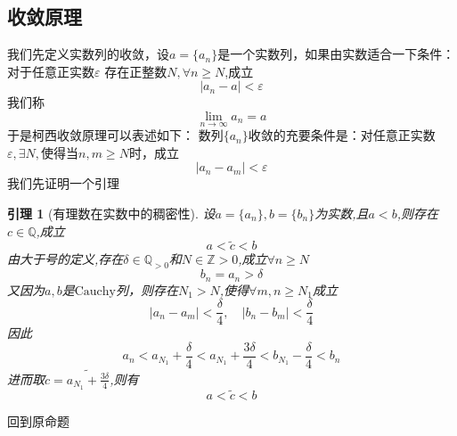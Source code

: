 \documentclass[12pt, a4paper, oneside]{ctexart}
\newtheorem{lemma}{引理}[section]
\newcommand{\ep}{\varepsilon}
\newcommand{\cau}{\text{Cauchy}}
\newcommand{\an}{\{a_{n}\}}
\newcommand{\bn}{\{b_{n}\}}
\newcommand{\bol}{\widetilde}
\begin{document}
\subsection{\cau 收敛原理}
我们先定义实数列的收敛，设$a=\an$是一个实数列，如果由实数适合一下条件：对于任意正实数$\ep$
存在正整数$N,\forall n\ge N $,成立
\begin{equation*}
    |a_{n}-a|<\ep
\end{equation*}
我们称 $$\lim_{n \to \infty}a_{n}=a $$
于是柯西收敛原理可以表述如下：
数列$\an$收敛的充要条件是：对任意正实数$\ep,\exists N,$使得当$n,m\ge N$时，成立
\begin{equation*}
    |a_{n}-a_{m}|<\ep
\end{equation*}
我们先证明一个引理
\begin{lemma}[有理数在实数中的稠密性]
    设$a=\an,b=\bn$为实数,且$a<b$,则存在$c\in \mathbb{Q}$,成立
    \begin{equation*}
        a<\bol{c}<b
    \end{equation*}
    由大于号的定义,存在$\delta\in\mathbb{Q}_{>0}$和$N\in\mathbb{Z}{>0}$,成立$\forall n\ge N$
    \begin{equation*}
        b_{n}=a_{n}>\delta
    \end{equation*}
    又因为$a,b$是$\cau$列，则存在$N_{1}>N$,使得$\forall m,n\ge N_{1}$成立
    \begin{equation*}
        |a_{n}-a_{m}|<\frac{\delta}{4},\quad |b_{n}-b_{m}|<\frac{\delta}{4}
    \end{equation*}
    因此
    \begin{equation*}
        a_{n}<a_{N_{1}}+\frac{\delta}{4}<a_{N_{1}}+\frac{3\delta}{4}<b_{N_{1}}-\frac{\delta}{4}<b_{n}
    \end{equation*}
    进而取$\bol{c}=\bol{a_{N_{1}}+\frac{3\delta}{4}}$,则有
    \begin{equation*}
        a<\bol{c}<b
    \end{equation*}
\end{lemma}
回到原命题
\end{document}
